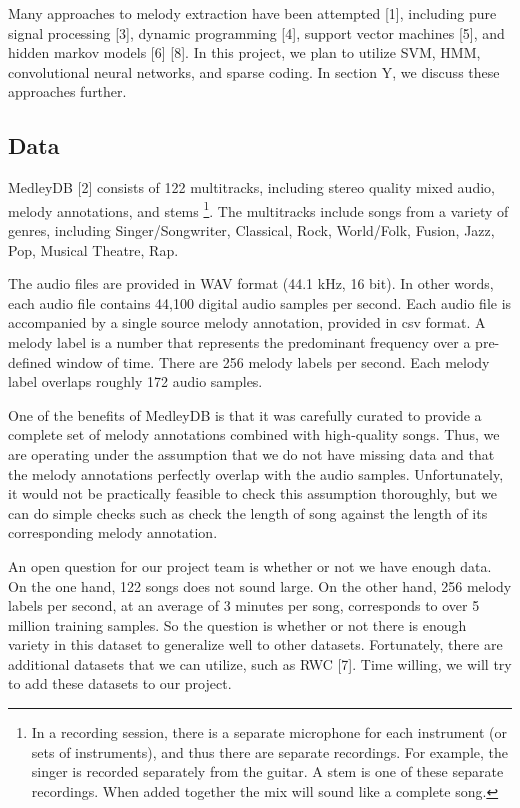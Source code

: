 \documentclass{article} %
\begin{document}
Many approaches to melody extraction have been attempted [1], including pure signal processing [3], dynamic programming [4], support vector machines [5], and hidden markov models [6] [8].  In this project, we plan to utilize SVM, HMM, convolutional neural networks, and sparse coding.  In section Y, we discuss these approaches further.

\subsection{Data}

MedleyDB [2] consists of 122 multitracks, including stereo quality mixed audio, melody annotations, and stems \footnote{In a recording session, there is a separate microphone for each instrument (or sets of instruments), and thus there are separate recordings.  For example, the singer is recorded separately from the guitar.  A stem is one of these separate recordings.  When added together the mix will sound like a complete song.}.  The multitracks include songs from a variety of genres, including Singer/Songwriter, Classical, Rock, World/Folk, Fusion, Jazz, Pop, Musical Theatre, Rap.

The audio files are provided in WAV format (44.1 kHz, 16 bit).  In other words, each audio file contains 44,100 digital audio samples per second.  Each audio file is accompanied by a single source melody annotation, provided in csv format.  A melody label is a number that represents the predominant frequency over a pre-defined window of time.  There are 256 melody labels per second.  Each melody label overlaps roughly 172 audio samples.

One of the benefits of MedleyDB is that it was carefully curated to provide a complete set of melody annotations combined with high-quality songs.  Thus, we are operating under the assumption that we do not have missing data and that the melody annotations perfectly overlap with the audio samples.  Unfortunately, it would not be practically feasible to check this assumption thoroughly, but we can do simple checks such as check the length of song against the length of its corresponding melody annotation.

An open question for our project team is whether or not we have enough data.  On the one hand, 122 songs does not sound large.  On the other hand, 256 melody labels per second, at an average of 3 minutes per song, corresponds to over 5 million training samples.  So the question is whether or not there is enough variety in this dataset to generalize well to other datasets.  Fortunately, there are additional datasets that we can utilize, such as RWC [7].  Time willing, we will try to add these datasets to our project.
\end{document}
